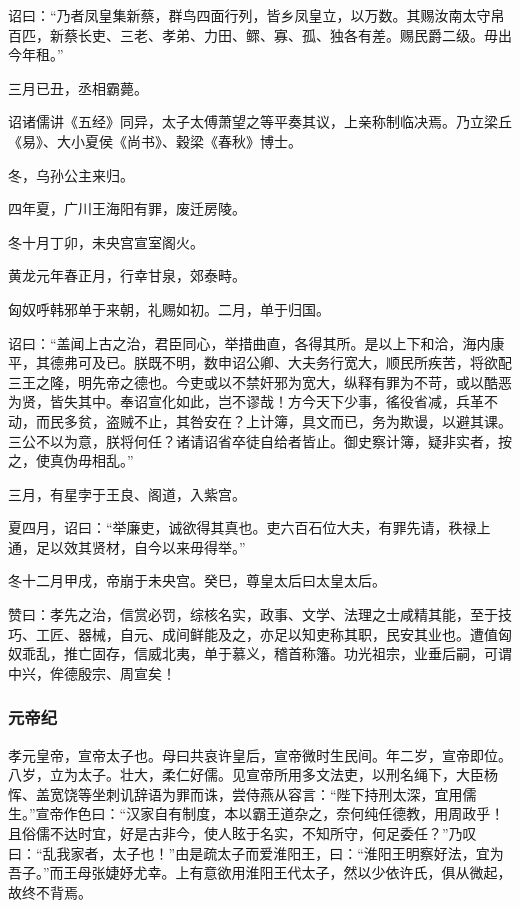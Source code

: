 \documentclass[]{article}
\begin{document}
诏曰：``乃者凤皇集新蔡，群鸟四面行列，皆乡凤皇立，以万数。其赐汝南太守帛百匹，新蔡长吏、三老、孝弟、力田、鳏、寡、孤、独各有差。赐民爵二级。毋出今年租。''

三月已丑，丞相霸薨。

诏诸儒讲《五经》同异，太子太傅萧望之等平奏其议，上亲称制临决焉。乃立梁丘《易》、大小夏侯《尚书》、穀梁《春秋》博士。

冬，乌孙公主来归。

四年夏，广川王海阳有罪，废迁房陵。

冬十月丁卯，未央宫宣室阁火。

黄龙元年春正月，行幸甘泉，郊泰畤。

匈奴呼韩邪单于来朝，礼赐如初。二月，单于归国。

诏曰：``盖闻上古之治，君臣同心，举措曲直，各得其所。是以上下和洽，海内康平，其德弗可及已。朕既不明，数申诏公卿、大夫务行宽大，顺民所疾苦，将欲配三王之隆，明先帝之德也。今吏或以不禁奸邪为宽大，纵释有罪为不苛，或以酷恶为贤，皆失其中。奉诏宣化如此，岂不谬哉！方今天下少事，徭役省减，兵革不动，而民多贫，盗贼不止，其咎安在？上计簿，具文而已，务为欺谩，以避其课。三公不以为意，朕将何任？诸请诏省卒徒自给者皆止。御史察计簿，疑非实者，按之，使真伪毋相乱。''

三月，有星孛于王良、阁道，入紫宫。

夏四月，诏曰：``举廉吏，诚欲得其真也。吏六百石位大夫，有罪先请，秩禄上通，足以效其贤材，自今以来毋得举。''

冬十二月甲戌，帝崩于未央宫。癸巳，尊皇太后曰太皇太后。

赞曰：孝先之治，信赏必罚，综核名实，政事、文学、法理之士咸精其能，至于技巧、工匠、器械，自元、成间鲜能及之，亦足以知吏称其职，民安其业也。遭值匈奴乖乱，推亡固存，信威北夷，单于慕义，稽首称籓。功光祖宗，业垂后嗣，可谓中兴，侔德殷宗、周宣矣！

\hypertarget{header-n878}{%
\subsubsection{元帝纪}\label{header-n878}}

孝元皇帝，宣帝太子也。母曰共哀许皇后，宣帝微时生民间。年二岁，宣帝即位。八岁，立为太子。壮大，柔仁好儒。见宣帝所用多文法吏，以刑名绳下，大臣杨恽、盖宽饶等坐刺讥辞语为罪而诛，尝侍燕从容言：``陛下持刑太深，宜用儒生。''宣帝作色曰：``汉家自有制度，本以霸王道杂之，奈何纯任德教，用周政乎！且俗儒不达时宜，好是古非今，使人眩于名实，不知所守，何足委任？''乃叹曰：``乱我家者，太子也！''由是疏太子而爱淮阳王，曰：``淮阳王明察好法，宜为吾子。''而王母张婕妤尤幸。上有意欲用淮阳王代太子，然以少依许氏，俱从微起，故终不背焉。
\end{document}

